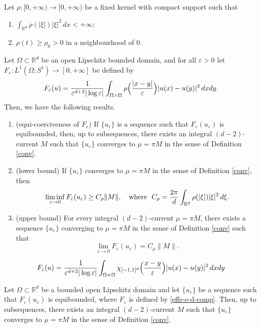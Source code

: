 \documentclass[10pt,a4paper]{amsart}
\def\dxy{\,dx dy}
\def\e{\varepsilon}
\begin{document}
\begin{theorem}\label{comp-convergence}
Let $\rho\colon[0,+\infty)\to[0,+\infty)$ be a fixed kernel with compact support such that 
\begin{enumerate}
    \item[\rm(a)] $\displaystyle\int_{\mathbb R^d}\rho(|\xi|)|\xi|^2\, dx<+\infty;$
    \item[\rm(b)] $\rho(t)\geq \rho_0 >0$ in a neighbourhood of $0$. 
\end{enumerate} 
Let $\Omega\subset\mathbb R^d$ be an open Lipschitz bounded domain, and for all $\e>0$ let $F_\e\colon L^1(\Omega; S^1)\to [0,+\infty]$ be defined by 
\begin{equation*}
F_\e(u)=
{1\over\e^{d+2}|\log\e|} \int_{\Omega\times\Omega}\rho\Bigl({|x-y|\over\e}\Bigr) {|u(x)-u(y)|^2}\dxy.
\end{equation*}
Then, we have the following results. 
\begin{enumerate}
\item[{\rm (i)}] {\rm (equi-coerciveness of $F_\e$)} 
If $\{u_\e\}$ is a sequence such that 
$F_\e(u_\e)$ is equibounded,  
then, up to subsequences, there exists an integral $(d-2)$-current $M$ 
such that $\{u_\e\}$ converges to $\mu=\pi M$ in the sense of Definition {\rm\ref{conv}}. 
\item[{\rm (ii)}] {\rm (lower bound)} 
If $\{u_\e\}$ converges to $\mu=\pi M$ in the sense of Definition {\rm\ref{conv}}, then 
\begin{equation}\label{Crho}
\liminf_{\e\to 0}F_\e(u_\e)\geq C_\rho \|M\|, \ \ \hbox{ where } \  C_\rho={2\pi\over d}\int_{\mathbb R^d}\rho(|\xi|)|\xi|^2\, d\xi.
\end{equation} 
\item[{\rm (iii)}] {\rm (upper bound)} For every integral $(d-2)$-current $\mu=\pi M$, there exists a sequence $\{u_\e\}$ converging to $\mu=\pi M$ in the sense of Definition {\rm\ref{conv}} such that 
$$\lim_{\e\to 0}F_\e(u_\e)= C_\rho \|M\|.$$
\end{enumerate}
\end{theorem}

\begin{equation}\label{effe-e-d-comp}
F_\e(u)={1\over\e^{d+2}|\log\e|} \int_{\Omega\times\Omega}\chi_{[-1,1]^d}\Bigl({x-y\over\e}\Bigr) {|u(x)-u(y)|^2}\dxy 
\end{equation}

\begin{lemma}[Compactness]\label{compactness}
Let $\Omega\subset \mathbb R^d$ be a bounded open Lipschitz domain and let 
$\{u_\e\}$ be a sequence such that 
$F_\e(u_\e)$ is equibounded, where $F_\e$ is defined by
\eqref{effe-e-d-comp}. 
Then, up to subsequences, there exists an integral $(d-2)$-current $M$ 
such that $\{u_\e\}$ converges to $\mu=\pi M$ in the sense of Definition {\rm\ref{conv}}. 
\end{lemma}
\end{document}
